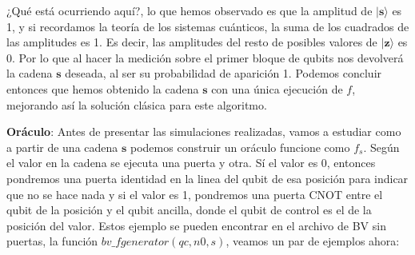  \vspace{5pt}

 ¿Qué está ocurriendo aquí?, lo que hemos observado es que la amplitud de $|\mathbf{s}\rangle$ es 1, y si recordamos la teoría de los sistemas cuánticos, la suma de los cuadrados de las amplitudes es 1. Es decir, las amplitudes del resto de posibles valores de $|\mathbf{z}\rangle$ es 0. Por lo que al hacer la medición sobre el primer bloque de qubits nos devolverá la cadena $\mathbf{s}$ deseada, al ser su probabilidad de aparición 1. Podemos concluir entonces que hemos obtenido la cadena $\mathbf{s}$ con una única ejecución de $f$, mejorando así la solución clásica para este algoritmo.\newline

 
 \textbf{Oráculo}: Antes de presentar las simulaciones realizadas, vamos a estudiar como a partir de una cadena $\mathbf{s}$ podemos construir un oráculo funcione como $f_{s}$. Según el valor en la cadena se ejecuta una puerta y otra. Sí el valor es 0, entonces pondremos una puerta identidad en la linea del qubit de esa posición para indicar que no se hace nada y si el valor es 1, pondremos una puerta CNOT entre el qubit de la posición y el qubit ancilla, donde el qubit de control es el de la posición del valor. Estos ejemplo se pueden encontrar en el archivo de BV sin puertas, la función \textit{$bv\_fgenerator(qc,n0,s)$}, veamos un par de ejemplos ahora:
 
